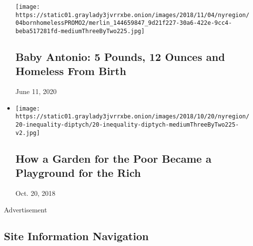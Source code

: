 \begin{itemize}
  \texttt{[image: https://static01.graylady3jvrrxbe.onion/images/2018/11/04/nyregion/04bornhomelessPROMO2/merlin\_144659847\_9d21f227-30a6-422e-9cc4-beba517281fd-mediumThreeByTwo225.jpg]}

  \hypertarget{baby-antonio-5-pounds-12-ounces-and-homeless-from-birth}{%
  \subsection{Baby Antonio: 5 Pounds, 12 Ounces and Homeless From
  Birth}\label{baby-antonio-5-pounds-12-ounces-and-homeless-from-birth}}

  June 11, 2020
\item
  \href{https://www.nytimes3xbfgragh.onion/interactive/2018/10/18/nyregion/new-york-city-inequality-gentrification.html}{}

  \texttt{[image: https://static01.graylady3jvrrxbe.onion/images/2018/10/20/nyregion/20-inequality-diptych/20-inequality-diptych-mediumThreeByTwo225-v2.jpg]}

  \hypertarget{how-a-garden-for-the-poor-became-a-playground-for-the-rich}{%
  \subsection{How a Garden for the Poor Became a Playground for the
  Rich}\label{how-a-garden-for-the-poor-became-a-playground-for-the-rich}}

  Oct. 20, 2018
\end{itemize}

Advertisement

\hypertarget{site-information-navigation}{%
\subsection{Site Information
Navigation}\label{site-information-navigation}}

